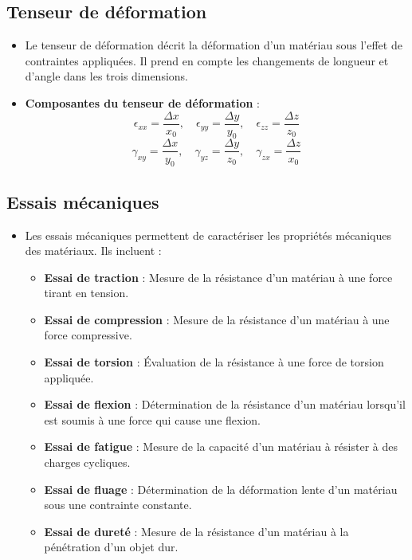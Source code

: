 \documentclass{article}
\begin{document}
    \subsection{Tenseur de déformation}
    
    \begin{itemize}
        \item Le tenseur de déformation décrit la déformation d'un matériau sous l'effet de contraintes appliquées. Il prend en compte les changements de longueur et d'angle dans les trois dimensions.
        \item \textbf{Composantes du tenseur de déformation} :
        \[
        \epsilon_{xx} = \frac{\Delta x}{x_0}, \quad \epsilon_{yy} = \frac{\Delta y}{y_0}, \quad \epsilon_{zz} = \frac{\Delta z}{z_0}
        \]
        \[
        \gamma_{xy} = \frac{\Delta x}{y_0}, \quad \gamma_{yz} = \frac{\Delta y}{z_0}, \quad \gamma_{zx} = \frac{\Delta z}{x_0}
        \]
    \end{itemize}
    
    \subsection{Essais mécaniques}
    
    \begin{itemize}
        \item Les essais mécaniques permettent de caractériser les propriétés mécaniques des matériaux. Ils incluent :
        \begin{itemize}
            \item \textbf{Essai de traction} : Mesure de la résistance d'un matériau à une force tirant en tension.
            \item \textbf{Essai de compression} : Mesure de la résistance d'un matériau à une force compressive.
            \item \textbf{Essai de torsion} : Évaluation de la résistance à une force de torsion appliquée.
            \item \textbf{Essai de flexion} : Détermination de la résistance d'un matériau lorsqu'il est soumis à une force qui cause une flexion.
            \item \textbf{Essai de fatigue} : Mesure de la capacité d'un matériau à résister à des charges cycliques.
            \item \textbf{Essai de fluage} : Détermination de la déformation lente d'un matériau sous une contrainte constante.
            \item \textbf{Essai de dureté} : Mesure de la résistance d'un matériau à la pénétration d'un objet dur.
        \end{itemize}
    \end{itemize}
\end{document}
